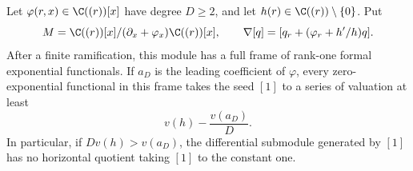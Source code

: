 \begin{theorem}\label{thm:stationaryballs}
Let $\varphi(r,x)\in\C((r))[x]$ have degree $D\geq2$, and let
$h(r)\in\C((r))\setminus\{0\}$. Put
\[
 M=\C((r))[x]/(\partial_x+\varphi_x)\C((r))[x],\qquad
 \nabla[q]=[q_r+(\varphi_r+h'/h)q].
\]
After a finite ramification, this module has a full frame of rank-one
formal exponential functionals. If $a_D$ is the leading coefficient
of $\varphi$, every zero-exponential functional in this frame takes
the seed $[1]$ to a series of valuation at least
\begin{equation}\label{eq:valuationbound}
 v(h)-\frac{v(a_D)}D.
\end{equation}
In particular, if $Dv(h)>v(a_D)$, the differential submodule generated
by $[1]$ has no horizontal quotient taking $[1]$ to the constant one.
\end{theorem}
